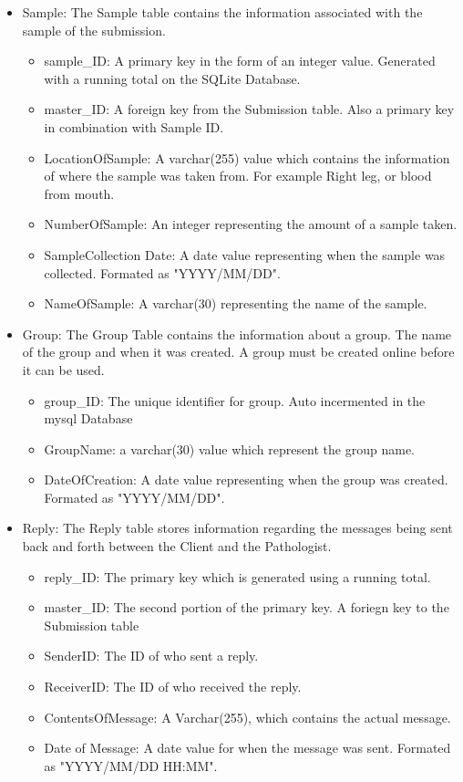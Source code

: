 \documentclass[onecolumn, draftclsnofoot, article, 10pt, compsoc]{IEEEtran}
\begin{document}
\begin{itemize}
\item Sample:\newline
The Sample table contains the information associated with the sample of the submission. 
\begin{itemize}
\item sample\_ID: A primary key in the form of an integer value. Generated with a running total on the SQLite Database.
\item master\_ID: A foreign key from the Submission table. Also a primary key in combination with Sample ID.
\item LocationOfSample: A varchar(255) value which contains the information of where the sample was taken from. For example Right leg, or blood from mouth.
\item NumberOfSample: An integer representing the amount of a sample taken.
\item SampleCollection Date: A date value representing when the sample was collected. Formated as "YYYY/MM/DD".
\item NameOfSample: A varchar(30) representing the name of the sample.
\end{itemize}

\item Group:\newline
The Group Table contains the information about a group. The name of the group and when it was created. A group must be created online before it can be used.
\begin{itemize}
\item group\_ID: The unique identifier for group. Auto incermented in the mysql Database
\item GroupName: a varchar(30) value which represent the group name. 
\item DateOfCreation: A date value representing when the group was created. Formated as "YYYY/MM/DD".
\end{itemize}

\item Reply:\newline
The Reply table stores information regarding the messages being sent back and forth between the Client and the Pathologist.
\begin{itemize}
\item reply\_ID: The primary key which is generated using a running total.
\item master\_ID: The second portion of the primary key. A foriegn key to the Submission table
\item SenderID: The ID of who sent a reply.
\item ReceiverID: The ID of who received the reply.
\item ContentsOfMessage: A Varchar(255), which contains the actual message.
\item Date of Message: A date value for when the message was sent. Formated as "YYYY/MM/DD HH:MM".
\end{itemize}


\end{itemize}
\end{document}
